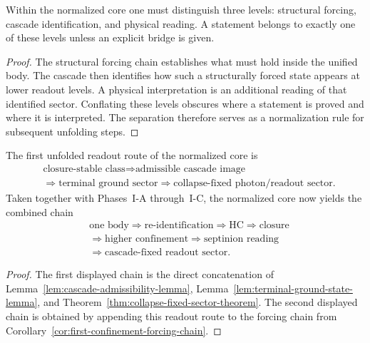 \begin{lemma}
\label{lem:readout-separation-lemma}
Within the normalized core one must distinguish three levels: structural
forcing, cascade identification, and physical reading. A statement belongs to
exactly one of these levels unless an explicit bridge is given.
\end{lemma}

\begin{proof}
The structural forcing chain establishes what must hold inside the unified
body. The cascade then identifies how such a structurally forced state appears
at lower readout levels. A physical interpretation is an additional reading of
that identified sector. Conflating these levels obscures where a statement is
proved and where it is interpreted. The separation therefore serves as a
normalization rule for subsequent unfolding steps.
\end{proof}

\begin{corollary}
\label{cor:first-readout-forcing-chain}
The first unfolded readout route of the normalized core is
\[
\begin{aligned}
&\text{closure-stable class} \Longrightarrow \text{admissible cascade image}\\
&\Longrightarrow \text{terminal ground sector} \Longrightarrow \text{collapse-fixed photon/readout sector}.
\end{aligned}
\]
Taken together with Phases~I-A through~I-C, the normalized core now yields the
combined chain
\[
\begin{aligned}
&\text{one body} \Longrightarrow \text{re-identification} \Longrightarrow \mathrm{HC} \Longrightarrow \text{closure}\\
&\Longrightarrow \text{higher confinement} \Longrightarrow \text{septinion reading}\\
&\Longrightarrow \text{cascade-fixed readout sector}.
\end{aligned}
\]
\end{corollary}

\begin{proof}
The first displayed chain is the direct concatenation of
Lemma~\ref{lem:cascade-admissibility-lemma},
Lemma~\ref{lem:terminal-ground-state-lemma}, and
Theorem~\ref{thm:collapse-fixed-sector-theorem}. The second displayed chain is
obtained by appending this readout route to the forcing chain from
Corollary~\ref{cor:first-confinement-forcing-chain}.
\end{proof}


